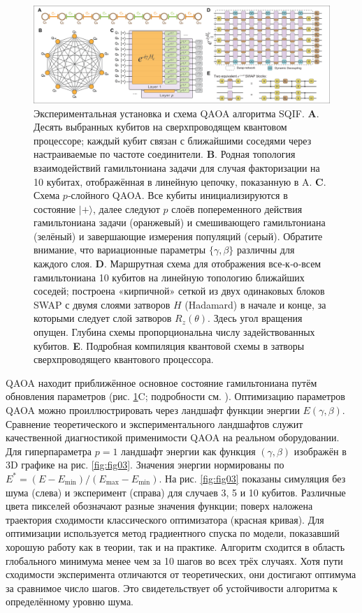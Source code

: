 \begin{figure}
    \centering
    \includegraphics[scale=0.38]{inc/fig_02.png}
    \caption{
        Экспериментальная установка и схема QAOA алгоритма SQIF. \textbf{A}.
        Десять выбранных кубитов на сверхпроводящем квантовом процессоре;
        каждый кубит связан с ближайшими соседями через настраиваемые по
        частоте соединители. \textbf{B}. Родная топология взаимодействий
        гамильтониана задачи для случая факторизации на 10 кубитах,
        отображённая в линейную цепочку, показанную в A. \textbf{C}. Схема
        $p$‑слойного QAOA. Все кубиты инициализируются в состояние $|+\rangle$,
        далее следуют $p$ слоёв попеременного действия гамильтониана задачи
        (оранжевый) и смешивающего гамильтониана (зелёный) и завершающие
        измерения популяций (серый). Обратите внимание, что вариационные
        параметры $\{\gamma,\beta\}$ различны для каждого слоя. \textbf{D}.
        Маршрутная схема для отображения все‑к‑о‑всем гамильтониана 10 кубитов
        на линейную топологию ближайших соседей; построена «кирпичной» сеткой
        из двух одинаковых блоков SWAP с двумя слоями затворов $H$ (Hadamard) в
        начале и конце, за которыми следует слой затворов $R_z(\theta)$. Здесь
        угол вращения опущен. Глубина схемы пропорциональна числу
        задействованных кубитов. \textbf{E}. Подробная компиляция квантовой
        схемы в затворы сверхпроводящего квантового процессора.
    }
    \label{fig:fig02}
\end{figure}

QAOA находит приближённое основное состояние гамильтониана путём обновления
параметров (рис. \ref{fig:fig02}C; подробности см. \cite{cite_31}). Оптимизацию
параметров QAOA можно проиллюстрировать через ландшафт функции энергии
$E(\gamma,\beta)$. Сравнение теоретического и экспериментального ландшафтов
служит качественной диагностикой применимости QAOA на реальном оборудовании.
Для гиперпараметра $p=1$ ландшафт энергии как функция $(\gamma,\beta)$
изображён в 3D графике на рис. \ref{fig:fig03}. Значения энергии нормированы по
$E^{\ast}=(E-E_{\min})/(E_{\max}-E_{\min})$. На рис. \ref{fig:fig03} показаны
симуляция без шума (слева) и эксперимент (справа) для случаев 3, 5
и 10 кубитов. Различные цвета пикселей обозначают разные значения функции;
поверх наложена траектория сходимости классического оптимизатора (красная
кривая). Для оптимизации используется метод градиентного спуска по модели,
показавший хорошую работу как в теории, так и на практике. Алгоритм сходится в
область глобального минимума менее чем за 10 шагов во всех трёх случаях. Хотя
пути сходимости эксперимента отличаются от теоретических, они достигают
оптимума за сравнимое число шагов. Это свидетельствует об устойчивости
алгоритма к определённому уровню шума.

